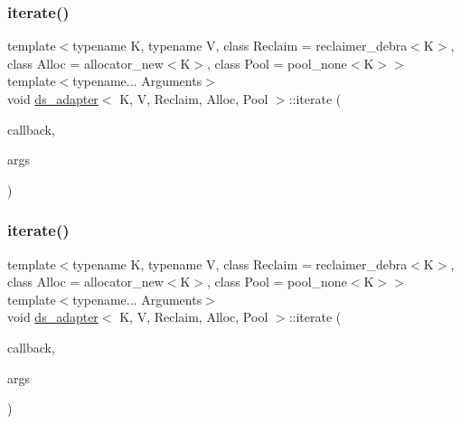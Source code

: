 \subsubsection{\texorpdfstring{iterate()}{iterate()}\hspace{0.1cm}{\footnotesize\ttfamily [2/5]}}
{\footnotesize\ttfamily template$<$typename K, typename V, class Reclaim = reclaimer\+\_\+debra$<$\+K$>$, class Alloc = allocator\+\_\+new$<$\+K$>$, class Pool = pool\+\_\+none$<$\+K$>$$>$ \\
template$<$typename... Arguments$>$ \\
void \hyperlink{classds__adapter}{ds\+\_\+adapter}$<$ K, V, Reclaim, Alloc, Pool $>$\+::iterate (\begin{DoxyParamCaption}\item[{void($\ast$)(K key, V value, Arguments... args)}]{callback,  }\item[{Arguments...}]{args }\end{DoxyParamCaption})\hspace{0.3cm}{\ttfamily [inline]}}

\mbox{\label{classds__adapter_ab1e0bb9a9b403ba68e85bf53219b1368}} 
\subsubsection{\texorpdfstring{iterate()}{iterate()}\hspace{0.1cm}{\footnotesize\ttfamily [3/5]}}
{\footnotesize\ttfamily template$<$typename K, typename V, class Reclaim = reclaimer\+\_\+debra$<$\+K$>$, class Alloc = allocator\+\_\+new$<$\+K$>$, class Pool = pool\+\_\+none$<$\+K$>$$>$ \\
template$<$typename... Arguments$>$ \\
void \hyperlink{classds__adapter}{ds\+\_\+adapter}$<$ K, V, Reclaim, Alloc, Pool $>$\+::iterate (\begin{DoxyParamCaption}\item[{void($\ast$)(K key, V value, Arguments... args)}]{callback,  }\item[{Arguments...}]{args }\end{DoxyParamCaption})\hspace{0.3cm}{\ttfamily [inline]}}

\mbox{\label{classds__adapter_ab1e0bb9a9b403ba68e85bf53219b1368}} 
